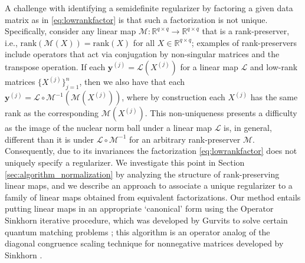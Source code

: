 \documentclass[11pt,letterpaper]{article}
\newcommand{\R}{\mathbb{R}}
\newcommand{\by}{\mathbf{y}}
\renewcommand{\L}{\mathcal{L}}
\begin{document}
A challenge with identifying a semidefinite regularizer by factoring a given data matrix as in \eqref{eq:lowrankfactor} is that such a factorization is not unique.  Specifically, consider any linear map $\mathcal{M} : \R^{q \times q} \rightarrow \R^{q \times q}$ that is a rank-preserver, i.e., $\mathrm{rank}(\mathcal{M}(X)) = \mathrm{rank}(X)$ for all $X \in \R^{q \times q}$; examples of rank-preservers include operators that act via conjugation by non-singular matrices and the transpose operation.  If each $\by^{(j)} = \L (X^{(j)})$ for a linear map $\L$ and low-rank matrices $\{X^{(j)}\}_{j=1}^n$, then we also have that each $\by^{(j)} = \L \circ \mathcal{M}^{-1} (\mathcal{M}(X^{(j)}))$, where by construction each $X^{(j)}$ has the same rank as the corresponding $\mathcal{M}(X^{(j)})$.  This non-uniqueness presents a difficulty as the image of the nuclear norm ball under a linear map $\L$ is, in general, different than it is under $\L \circ {\mathcal{M}}^{-1}$ for an arbitrary rank-preserver $\mathcal{M}$.  Consequently, due to its invariances the factorization \eqref{eq:lowrankfactor} does not uniquely specify a regularizer.  We investigate this point in Section \ref{sec:algorithm_normalization} by analyzing the structure of rank-preserving linear maps, and we describe an approach to associate a unique regularizer to a family of linear maps obtained from equivalent factorizations.  Our method entails putting linear maps in an appropriate `canonical' form using the Operator Sinkhorn iterative procedure, which was developed by Gurvits to solve certain quantum matching problems \cite{Gur:04}; this algorithm is an operator analog of the diagonal congruence scaling technique for nonnegative matrices developed by Sinkhorn \cite{Gur:04}.
\end{document}
